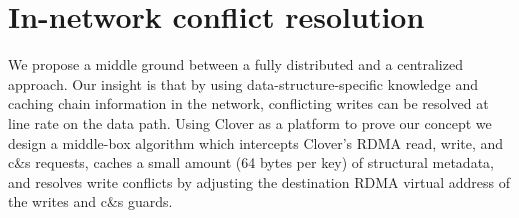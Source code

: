 

\section{In-network conflict resolution}

We propose a middle ground between a fully distributed and a
centralized approach.  Our insight is that by using
data-structure-specific knowledge and caching chain information in the
network, conflicting writes can be resolved at line rate on the data
path.  Using Clover as a platform to prove our concept we design a
middle-box algorithm which intercepts Clover's RDMA read,
write, and c\&s requests, caches a small amount (64 bytes per key) of
structural metadata, and resolves write conflicts by adjusting the
destination RDMA virtual address of the writes and c\&s guards.



